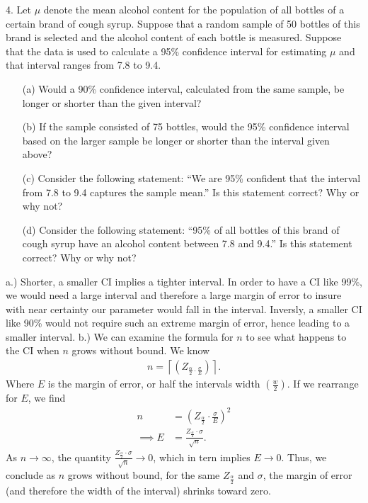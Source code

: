 \documentclass{report}
\begin{document}
\pagebreak \bigbreak \noindent 
\begin{mdframed}
4. Let $\mu$ denote the mean alcohol content for the population of all bottles of a certain brand of cough syrup. Suppose that a random sample of 50 bottles of this brand is selected and the alcohol content of each bottle is measured. Suppose that the data is used to calculate a 95\% confidence interval for estimating $\mu$ and that interval ranges from 7.8 to 9.4.
\begin{itemize}
    \item[(a)] Would a 90\% confidence interval, calculated from the same sample, be longer or shorter than the given interval?
    \item[(b)] If the sample consisted of 75 bottles, would the 95\% confidence interval based on the larger sample be longer or shorter than the interval given above?
    \item[(c)] Consider the following statement: “We are 95\% confident that the interval from 7.8 to 9.4 captures the sample mean.” Is this statement correct? Why or why not?
    \item[(d)] Consider the following statement: “95\% of all bottles of this brand of cough syrup have an alcohol content between 7.8 and 9.4.” Is this statement correct? Why or why not?
\end{itemize}
\end{mdframed}
\bigbreak \noindent 
a.) Shorter, a smaller CI implies a tighter interval. In order to have a CI like 99\%, we would need a large interval and therefore a large margin of error to insure with near certainty our parameter would fall in the interval. Inversly, a smaller CI like 90\% would not require such an extreme margin of error, hence leading to a smaller interval.
\bigbreak \noindent 
b.) We can examine the formula for $n$ to see what happens to the CI when $n$ grows without bound. We know
\begin{align*}
   n = \left\lceil \left(Z_{\frac{\alpha}{2} \cdot \frac{\sigma}{E}}\right)  \right\rceil
.\end{align*}
Where $E$ is the margin of error, or half the intervals width $\left(\frac{w}{2}\right)$. If we rearrange for $E$, we find
\begin{align*}
n &= \left(Z_{\frac{\alpha}{2}} \cdot \frac{\sigma}{E}\right)^{2}   \\
\implies E &= \frac{Z_{\frac{\alpha}{2}} \cdot \sigma}{\sqrt{n}}
.\end{align*}
\bigbreak \noindent 
As $n\rightarrow\infty$, the quantity $ \frac{Z_{\frac{\alpha}{2}} \cdot \sigma}{\sqrt{n}} \rightarrow 0$, which in tern implies $E \rightarrow 0$. Thus, we conclude as $n$ grows without bound, for the same $Z_{\frac{\alpha}{2}}$ and $\sigma$, the margin of error (and therefore the width of the interval) shrinks toward zero.
\end{document}
